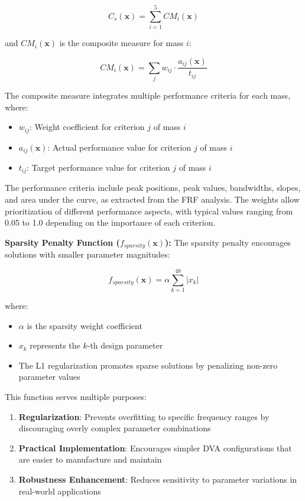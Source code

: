 \documentclass[12pt,a4paper]{article}
\begin{document}
\begin{equation}\label{Eq.singular_response_detailed}
C_s(\mathbf{x}) = \sum_{i=1}^{5} CM_i(\mathbf{x})
\end{equation}

and $CM_i(\mathbf{x})$ is the composite measure for mass $i$:

\begin{equation}\label{Eq.composite_measure_detailed}
CM_i(\mathbf{x}) = \sum_{j} w_{ij} \cdot \frac{a_{ij}(\mathbf{x})}{t_{ij}}
\end{equation}

The composite measure integrates multiple performance criteria for each mass, where:
\begin{itemize}
    \item $w_{ij}$: Weight coefficient for criterion $j$ of mass $i$
    \item $a_{ij}(\mathbf{x})$: Actual performance value for criterion $j$ of mass $i$
    \item $t_{ij}$: Target performance value for criterion $j$ of mass $i$
\end{itemize}

The performance criteria include peak positions, peak values, bandwidths, slopes, and area under the curve, as extracted from the FRF analysis. The weights allow prioritization of different performance aspects, with typical values ranging from 0.05 to 1.0 depending on the importance of each criterion.

\textbf{Sparsity Penalty Function ($f_{sparsity}(\mathbf{x})$):} The sparsity penalty encourages solutions with smaller parameter magnitudes:

\begin{equation}\label{Eq.sparsity_penalty_detailed}
f_{sparsity}(\mathbf{x}) = \alpha \sum_{k=1}^{48} |x_k|
\end{equation}

where:
\begin{itemize}
    \item $\alpha$ is the sparsity weight coefficient 
    \item $x_k$ represents the $k$-th design parameter
    \item The L1 regularization promotes sparse solutions by penalizing non-zero parameter values
\end{itemize}

This function serves multiple purposes:

\begin{enumerate}
    \item \textbf{Regularization}: Prevents overfitting to specific frequency ranges by discouraging overly complex parameter combinations
    \item \textbf{Practical Implementation}: Encourages simpler DVA configurations that are easier to manufacture and maintain
    \item \textbf{Robustness Enhancement}: Reduces sensitivity to parameter variations in real-world applications
\end{enumerate}
\end{document}
